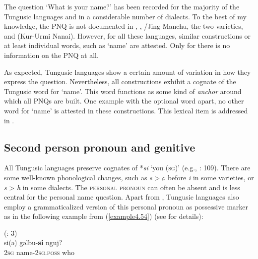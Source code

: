 \documentclass[output=paper,colorlinks,citecolor=brown]{langscibook}
\begin{document}
The question ‘What is your name?’ has been recorded for the majority of the Tungusic languages and in a considerable number of dialects. To the best of my knowledge, the PNQ is not documented in , , /Jing Manchu, the two  varieties, and  (Kur-Urmi Nanai). However, for all these languages, similar constructions or at least individual words, such as ‘name’ are attested. Only for   there is no information on the PNQ at all.

As expected, Tungusic languages show a certain amount of variation in how they express the question. Nevertheless, all constructions exhibit a cognate of the Tungusic word for ‘name’. This word functions as some kind of \textit{anchor} around which all PNQs are built. One example with the optional  word apart, no other word for ‘name’ is attested in these constructions. This lexical item is addressed in .


\subsection{Second person pronoun and genitive}\label{section4.4.1}

All Tungusic languages preserve cognates of  *\textit{si} ‘you (\textsc{sg})’ (e.g., \citealt{Benzing1956}: 109). There are some well-known phonological changes, such as \textit{s} > \textit{ɕ} before \textit{i} in some  varieties, or \textit{s} > \textit{h} in some  dialects. The \textsc{personal pronoun} can often be absent and is less central for the personal name question. Apart from , Tungusic languages also employ a grammaticalized version of this personal pronoun as possessive marker as in the following example from  (\ref{example4.54}) (see \citealt{Ikegami1985} for details):

\ea
    \label{example4.54}
     (\citealt{Angina1993}: 3)\\
    \gll si(ə)	gəlbu-\textbf{si}			nguj?\\
    2\textsc{sg}		name-2\textsc{sg.poss}		who\\
    \z
\end{document}
